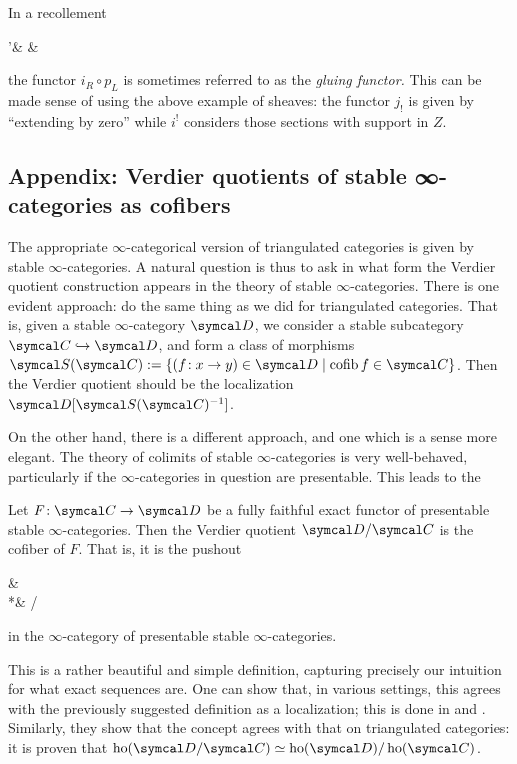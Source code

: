 In a recollement
\begin{diagram*}[column sep=large]
	\calT'\ar[r,"i" description,""{below,name=A},""{above,name=AA}] &
		\calT \ar[r,"p" description,""{below,name=C},""{above,name=CC}]\ar[l,bend left,shift left,"i_R",""{above,name=B}]\ar[l,bend right,shift right,"i_L"',""{below,name=BB}] &
		 \ar[l,bend left,shift left,"p_R",""{above,name=D}]\ar[l,bend right,shift right,"p_L"',""{below,name=DD}]
		\ar[from=B,to=A,symbol=\vdash]\ar[from=D,to=C,symbol=\vdash]
		\ar[from=AA,to=BB,symbol=\vdash]\ar[from=CC,to=DD,symbol=\vdash]
\end{diagram*}
the functor \(i_R\circ p_L\) is sometimes referred to as the \emph{gluing functor.} This can be made sense of using the above example of sheaves: the functor \(j_!\) is given
by ``extending by zero'' while \(i^!\) considers those sections with support in \(Z\).

\subsection{Appendix: Verdier quotients of stable ∞-categories as cofibers}
The appropriate \(\infty\)-categorical version of triangulated categories is given by stable \(\infty\)-categories. A natural question is thus to ask in
what form the Verdier quotient construction appears in the theory of stable \(\infty\)-categories. There is one evident approach: do the same thing as we did
for triangulated categories. That is, given a stable \(\infty\)-category \(\calD\), we consider a stable subcategory \(\calC\inj\calD\), and form
a class of morphisms \(\calS(\calC) := \{ (f\!:x\to y)\in\calD\mid \cofib{f}\in\calC \}\). Then the Verdier quotient should be the localization \(\calD[\calS(\calC)^{-1}]\).

On the other hand, there is a different approach, and one which is a sense more elegant. The theory of colimits of stable \(\infty\)-categories is very well-behaved,
particularly if the \(\infty\)-categories in question are presentable. This leads to the
\begin{definition}
	Let \(F\!:\calC\to\calD\) be a fully faithful exact functor of presentable stable \(\infty\)-categories. Then the Verdier quotient \(\calD/\calC\)
	is the cofiber of \(F\). That is, it is the pushout
	\begin{diagram*}
		\calC\ar[r,"F"]\ar[d] & \calD\ar[d] \\
		*\ar[r] & \calD/\calC\ar[ul,pushout]
	\end{diagram*}
	in the \(\infty\)-category of presentable stable \(\infty\)-categories.
\end{definition}
This is a rather beautiful and simple definition, capturing precisely our intuition for what exact sequences are. One can show that, in various settings,
this agrees with the previously suggested definition as a localization; this is done in \cite{Blumberg_Gepner_Tabuada_2013} and \cite{drew2015verdierquotientsstablequasicategories}.
Similarly, they show that the concept agrees with that on triangulated categories: it is proven that \(\ho(\calD/\calC)\simeq\ho(\calD)/\ho(\calC)\).

